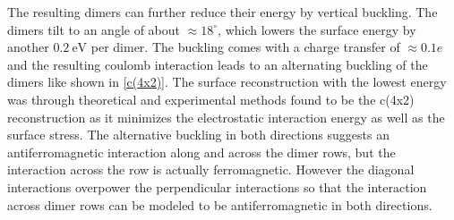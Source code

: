 	The resulting dimers can further reduce their energy by vertical buckling. The dimers tilt to an angle of about $\approx 18^\circ$, which lowers the surface energy by another $0.2~\text{eV}$ per dimer. The buckling comes with a charge transfer of $\approx0.1 e$  \cite{brand2023critical, landemark1992core} and the resulting coulomb interaction leads to an alternating buckling of the dimers like shown in \autoref{c(4x2)}. The surface reconstruction with the lowest energy was through theoretical \cite{ramstad1995theoretical} and experimental \cite{brand2023critical} methods found to be the c(4x2) reconstruction as it minimizes the electrostatic interaction energy as well as the surface stress. The alternative buckling in both directions suggests an antiferromagnetic interaction along and across the dimer rows, but the interaction across the row is actually ferromagnetic. However the diagonal interactions overpower the perpendicular interactions so that the interaction across dimer rows can be modeled to be antiferromagnetic in both directions.
